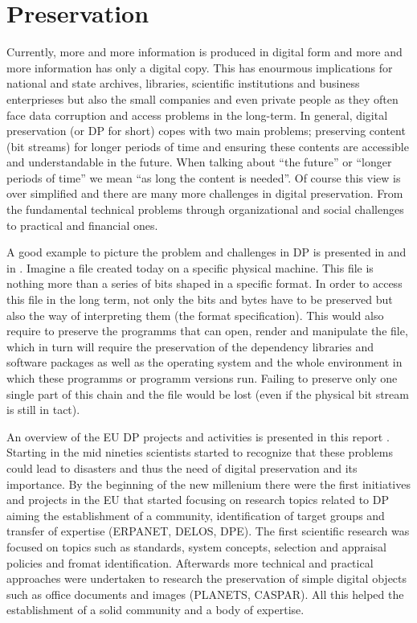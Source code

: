 \section{Preservation}
Currently, more and more information is produced in digital form and more and more information has only a digital copy. This has enourmous implications for national and state archives, libraries, scientific institutions and business enterprieses but also the small companies and even private people as they often face data corruption and access problems in the long-term.
In general, digital preservation (or DP for short) copes with two main problems; preserving content (bit streams) for longer periods of time and ensuring these contents are accessible and understandable in the future. When talking about ``the future'' or ``longer periods of time'' we mean ``as long the content is needed''.
Of course this view is over simplified and there are many more challenges in digital preservation. From the fundamental technical problems through organizational and social challenges to practical and financial ones.

A good example to picture the problem and challenges in DP is presented in \cite{Lorie:2001:LTP:379437.379726} and in \cite{Rauber:2009:dpchallenges}. Imagine a file created today on a specific physical machine. This file is nothing more than a series of bits shaped in a specific format. In order to access this file in the long term, not only the bits and bytes have to be preserved but also the way of interpreting them (the format specification). This would also require to preserve the programms that can open, render and manipulate the file, which in turn will require the preservation of the dependency libraries and software packages as well as the operating system and the whole environment in which these programms or programm versions run. Failing to preserve only one single part of this chain and the file would be lost (even if the physical bit stream is still in tact).

An overview of the EU DP projects and activities is presented in this report \cite{strodl:2011:dpreport}. Starting in the mid nineties scientists started to recognize that these problems could lead to disasters and thus the need of digital preservation and its importance. By the beginning of the new millenium there were the first initiatives and projects in the EU that started focusing on research topics related to DP aiming the establishment of a community, identification of target groups and transfer of expertise (ERPANET, DELOS, DPE). The first scientific research was focused on topics such as standards, system concepts, selection and appraisal policies and fromat identification. Afterwards more technical and practical approaches were undertaken to research the preservation of simple digital objects such as office documents and images (PLANETS, CASPAR). All this helped the establishment of a solid community and a body of expertise.

